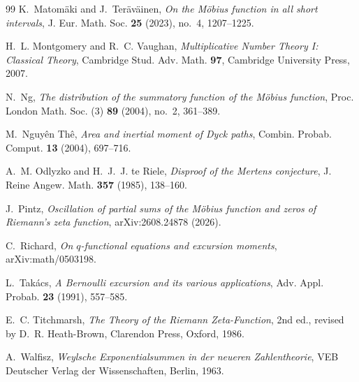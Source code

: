 \documentclass[11pt]{amsart}
\numberwithin{equation}{section}
\theoremstyle{plain}
\theoremstyle{definition}
\theoremstyle{remark}
\begin{document}
\begin{thebibliography}{99}
K.~Matom\"aki and J.~Ter\"av\"ainen, \emph{On the M\"obius function in all
short intervals}, J. Eur. Math. Soc. \textbf{25} (2023), no.~4, 1207--1225.

H.~L. Montgomery and R.~C. Vaughan, \emph{Multiplicative Number Theory I:
Classical Theory}, Cambridge Stud. Adv. Math. \textbf{97}, Cambridge
University Press, 2007.

N.~Ng, \emph{The distribution of the summatory function of the M\"obius
function}, Proc. London Math. Soc. (3) \textbf{89} (2004), no.~2, 361--389.

M.~Nguy\^en Th\^e, \emph{Area and inertial moment of Dyck paths}, Combin.
Probab. Comput. \textbf{13} (2004), 697--716.

A.~M. Odlyzko and H.~J.~J. te Riele, \emph{Disproof of the Mertens
conjecture}, J. Reine Angew. Math. \textbf{357} (1985), 138--160.

J.~Pintz, \emph{Oscillation of partial sums of the M\"obius function and
zeros of Riemann's zeta function}, arXiv:2608.24878 (2026).

C.~Richard, \emph{On $q$-functional equations and excursion moments},
arXiv:math/0503198.

L.~Tak\'acs, \emph{A Bernoulli excursion and its various applications},
Adv. Appl. Probab. \textbf{23} (1991), 557--585.

E.~C. Titchmarsh, \emph{The Theory of the Riemann Zeta-Function}, 2nd ed.,
revised by D.~R. Heath-Brown, Clarendon Press, Oxford, 1986.

A.~Walfisz, \emph{Weylsche Exponentialsummen in der neueren Zahlentheorie},
VEB Deutscher Verlag der Wissenschaften, Berlin, 1963.

\end{thebibliography}
\end{document}
